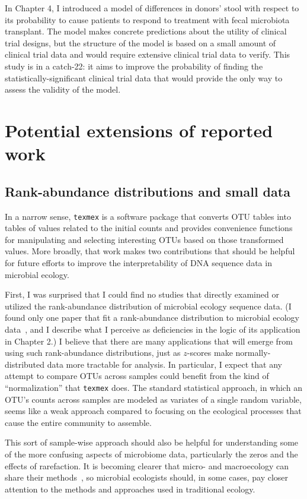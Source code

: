 In Chapter 4, I introduced a model of differences in donors' stool with
respect to its probability to cause patients to respond to treatment with fecal microbiota
transplant. The model makes concrete predictions about the utility of clinical
trial designs, but the structure of the model is based on a small amount of
clinical trial data and would require extensive clinical trial data to verify.
This study is in a catch-22: it aims to improve the probability of finding the
statistically-significant clinical trial data that would provide the only way to
assess the validity of the model.

\section{Potential extensions of reported work}
\subsection{Rank-abundance distributions and small data}
In a narrow sense, \texttt{texmex} is a software package that converts OTU tables
into tables of values related to the initial counts and provides convenience
functions for manipulating and selecting interesting OTUs based on those
transformed values. More broadly, that work makes two contributions that should
be helpful for future efforts to improve the interpretability of DNA sequence
data in microbial ecology.

First, I was surprised that I could find no studies that directly
examined or utilized the rank-abundance distribution of microbial ecology
sequence data. (I found only one paper that fit a rank-abundance distribution to
microbial ecology data~\cite{kembel_incorporating_2012}, and I describe what I
perceive as deficiencies in the logic of its application in Chapter 2.) I
believe that there are many applications that will emerge from using such
rank-abundance distributions, just as $z$-scores make normally-distributed data
more tractable for analysis. In particular, I expect that any attempt to
compare OTUs across samples could benefit from the kind of ``normalization''
that \texttt{texmex} does.
The standard statistical approach, in which an OTU's counts across samples are
modeled as variates of a single random variable, seems like a weak approach
compared to focusing on the ecological processes that cause the entire community
to assemble.

This sort of sample-wise approach should also be helpful for understanding some
of the more confusing aspects of microbiome data, particularly the zeros and
the effects of rarefaction.
It is becoming clearer that micro- and macroecology can share their methods~\cite{hughes_counting_2001},
so microbial ecologists should, in some cases, pay closer attention to the
methods and approaches used in traditional ecology.

